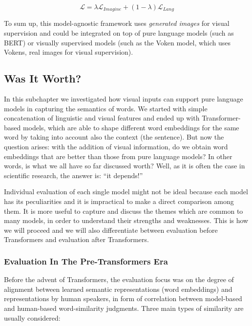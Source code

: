 \documentclass[
]{krantz}
\begin{document}
\[\mathcal{L}=\lambda\mathcal{L}_{Imagine}+(1-\lambda)\mathcal{L}_{Lang} \]

To sum up, this model-agnostic framework uses \emph{generated images} for visual supervision and could be integrated on top of pure language models (such as BERT) or visually supervised models (such as the Voken model, which uses Vokens, real images for visual supervision).

\hypertarget{was-it-worth}{%
\subsection{Was It Worth?}\label{was-it-worth}}

In this subchapter we investigated how visual inputs can support pure language models in capturing the semantics of words. We started with simple concatenation of linguistic and visual features and ended up with Transformer-based models, which are able to shape different word embeddings for the same word by taking into account also the context (the sentence). But now the question arises: with the addition of visual information, do we obtain word embeddings that are better than those from pure language models? In other words, is what we all have so far discussed worth? Well, as it is often the case in scientific research, the answer is: ``it depends!''

Individual evaluation of each single model might not be ideal because each model has its peculiarities and it is impractical to make a direct comparison among them. It is more useful to capture and discuss the themes which are common to many models, in order to understand their strengths and weaknesses. This is how we will proceed and we will also differentiate between evaluation before Transformers and evaluation after Transformers.

\hypertarget{evaluation-in-the-pre-transformers-era}{%
\subsubsection{Evaluation In The Pre-Transformers Era}\label{evaluation-in-the-pre-transformers-era}}

Before the advent of Transformers, the evaluation focus was on the degree of alignment between learned semantic representations (word embeddings) and representations by human speakers, in form of correlation between model-based and human-based word-similarity judgments. Three main types of similarity are usually considered:
\end{document}
